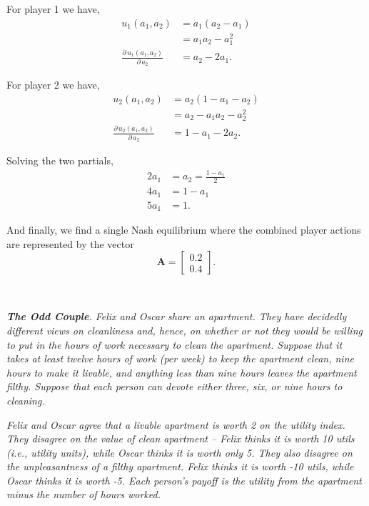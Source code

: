 \documentclass[12pt]{amsart}
\begin{document}
	For player 1 we have,
	\begin{align*}
		u_1(a_1,a_2) &= a_1(a_2-a_1) \\
					 &= a_1a_2-a_1^2 \\
		\frac{\partial\,u_1(a_1,a_2)}{\partial\,a_2} &= a_2-2a_1.
	\end{align*}
	
	For player 2 we have,
	\begin{align*}
		u_2(a_1,a_2) &= a_2(1-a_1-a_2) \\
					 &= a_2-a_1a_2-a_2^2 \\
		\frac{\partial\,u_2(a_1,a_2)}{\partial\,a_2} &= 1-a_1-2a_2.
	\end{align*}
	
	Solving the two partials,
	\begin{align*}
		2a_1 &= a_2 = \frac{1-a_1}{2} \\
		4a_1 &= 1-a_1 \\
		5a_1 &= 1.
	\end{align*}

	And finally, we find a single Nash equilibrium where the combined player actions are represented by the vector
	\[\mathbf A = \begin{bmatrix} 0.2 \\0.4 \end{bmatrix}.\]\\

\subsection{}
\textit{\textbf{The Odd Couple}. Felix and Oscar share an apartment. They have decidedly different views
	on cleanliness and, hence, on whether or not they would be willing to put in the hours of
	work necessary to clean the apartment. Suppose that it takes at least twelve hours of work
	(per week) to keep the apartment clean, nine hours to make it livable, and anything less
	than nine hours leaves the apartment filthy. Suppose that each person can devote either
	three, six, or nine hours to cleaning.}
	
\textit{Felix and Oscar agree that a livable apartment is worth 2 on the utility index. They
	disagree on the value of clean apartment – Felix thinks it is worth 10 utils (i.e., utility units),
	while Oscar thinks it is worth only 5. They also disagree on the unpleasantness of a filthy
	apartment. Felix thinks it is worth -10 utils, while Oscar thinks it is worth -5. Each person’s
	payoff is the utility from the apartment minus the number of hours worked.}
\end{document}
